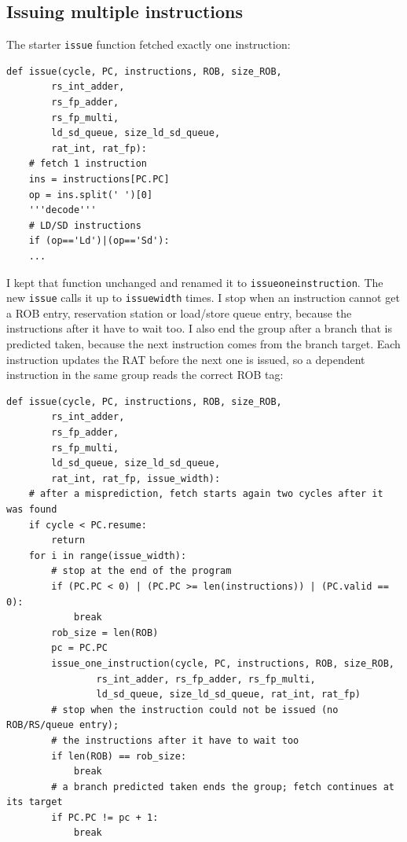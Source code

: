 \documentclass[11pt]{article}
\renewcommand{\_}{\origunderscore\allowbreak}
\begin{document}
\subsection{Issuing multiple instructions}

The starter \texttt{issue} function fetched exactly one instruction:

\begin{lstlisting}
def issue(cycle, PC, instructions, ROB, size_ROB, 
        rs_int_adder, 
        rs_fp_adder, 
        rs_fp_multi, 
        ld_sd_queue, size_ld_sd_queue, 
        rat_int, rat_fp):
    # fetch 1 instruction 
    ins = instructions[PC.PC]
    op = ins.split(' ')[0] 
    '''decode'''
    # LD/SD instructions
    if (op=='Ld')|(op=='Sd'):
    ...
\end{lstlisting}

I kept that function unchanged and renamed it to \texttt{issue\_one\_instruction}. The new
\texttt{issue} calls it up to \texttt{issue\_width} times. I stop when an instruction cannot get
a ROB entry, reservation station or load/store queue entry, because the instructions after it
have to wait too. I also end the group after a branch that is predicted taken, because the
next instruction comes from the branch target. Each instruction updates the RAT before the next one is issued, so a dependent
instruction in the same group reads the correct ROB tag:

\begin{lstlisting}
def issue(cycle, PC, instructions, ROB, size_ROB, 
        rs_int_adder, 
        rs_fp_adder, 
        rs_fp_multi, 
        ld_sd_queue, size_ld_sd_queue, 
        rat_int, rat_fp, issue_width):
    # after a misprediction, fetch starts again two cycles after it was found
    if cycle < PC.resume:
        return
    for i in range(issue_width):
        # stop at the end of the program
        if (PC.PC < 0) | (PC.PC >= len(instructions)) | (PC.valid == 0):
            break
        rob_size = len(ROB)
        pc = PC.PC
        issue_one_instruction(cycle, PC, instructions, ROB, size_ROB,
                rs_int_adder, rs_fp_adder, rs_fp_multi,
                ld_sd_queue, size_ld_sd_queue, rat_int, rat_fp)
        # stop when the instruction could not be issued (no ROB/RS/queue entry);
        # the instructions after it have to wait too
        if len(ROB) == rob_size:
            break
        # a branch predicted taken ends the group; fetch continues at its target
        if PC.PC != pc + 1:
            break
\end{lstlisting}
\end{document}
